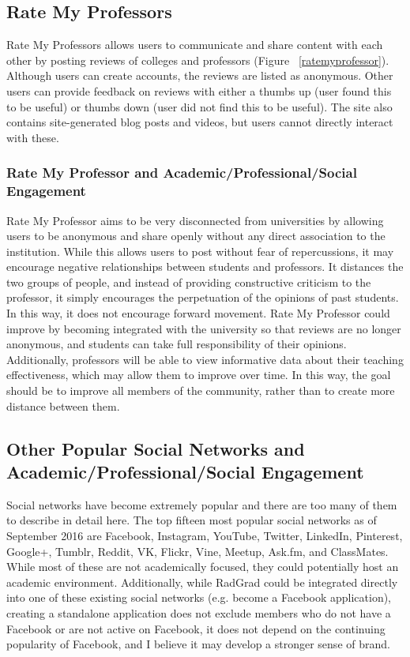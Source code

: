 \subsection{Rate My Professors}

Rate My Professors allows users to communicate and share content with each other by posting reviews of colleges and professors  \cite{RateMyProfessors} (Figure ~\ref{ratemyprofessor}). Although users can create accounts, the reviews are listed as anonymous. Other users can provide feedback on reviews with either a thumbs up (user found this to be useful) or thumbs down (user did not find this to be useful). The site also contains site-generated blog posts and videos, but users cannot directly interact with these.

\subsubsection{Rate My Professor and Academic/Professional/Social Engagement}

Rate My Professor aims to be very disconnected from universities by allowing users to be anonymous and share openly without any direct association to the institution. While this allows users to post without fear of repercussions, it may encourage negative relationships between students and professors. It distances the two groups of people, and instead of providing constructive criticism to the professor, it simply encourages the perpetuation of the opinions of past students. In this way, it does not encourage forward movement. Rate My Professor could improve by becoming integrated with the university so that reviews are no longer anonymous, and students can take full responsibility of their opinions. Additionally, professors will be able to view informative data about their teaching effectiveness, which may allow them to improve over time. In this way, the goal should be to improve all members of the community, rather than to create more distance between them.

\subsection{Other Popular Social Networks and Academic/Professional/Social Engagement}

Social networks have become extremely popular and there are too many of them to describe in detail here. The top fifteen most popular social networks as of September 2016 \cite{Most_Popular_Social_Media} are Facebook, Instagram, YouTube, Twitter, LinkedIn, Pinterest, Google+, Tumblr, Reddit, VK, Flickr, Vine, Meetup, Ask.fm, and ClassMates. While most of these are not academically focused, they could potentially host an academic environment. Additionally, while RadGrad could be integrated directly into one of these existing social networks (e.g. become a Facebook application), creating a standalone application does not exclude members who do not have a Facebook or are not active on Facebook, it does not depend on the continuing popularity of Facebook, and I believe it may develop a stronger sense of brand. 


